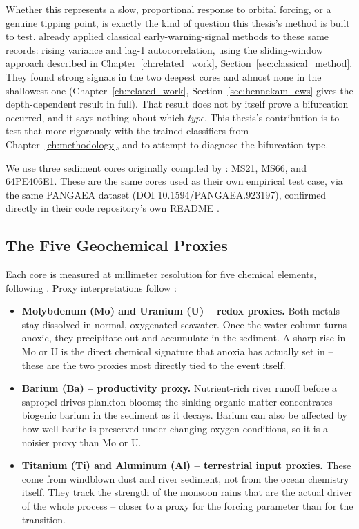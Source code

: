Whether this represents a slow, proportional response to orbital forcing, or a genuine tipping point, is exactly the kind of question this thesis's method is built to test. \citet{hennekam2020} already applied classical early-warning-signal methods to these same records: rising variance and lag-1 autocorrelation, using the sliding-window approach described in Chapter~\ref{ch:related_work}, Section~\ref{sec:classical_method}. They found strong signals in the two deepest cores and almost none in the shallowest one (Chapter~\ref{ch:related_work}, Section~\ref{sec:hennekam_ews} gives the depth-dependent result in full). That result does not by itself prove a bifurcation occurred, and it says nothing about which \emph{type}. This thesis's contribution is to test that more rigorously with the trained classifiers from Chapter~\ref{ch:methodology}, and to attempt to diagnose the bifurcation type.

We use three sediment cores originally compiled by \citet{hennekam2020}: MS21, MS66, and 64PE406E1. These are the same cores \citet{bury2021} used as their own empirical test case, via the same PANGAEA dataset (DOI 10.1594/PANGAEA.923197), confirmed directly in their code repository's own README \citep{burygithub}.

\subsection{The Five Geochemical Proxies}

Each core is measured at millimeter resolution for five chemical elements, following \citet{hennekam2020}. Proxy interpretations follow \citet{tribovillard2006}:

\begin{itemize}
    \item \textbf{Molybdenum (Mo) and Uranium (U) -- redox proxies.} Both metals stay dissolved in normal, oxygenated seawater. Once the water column turns anoxic, they precipitate out and accumulate in the sediment. A sharp rise in Mo or U is the direct chemical signature that anoxia has actually set in -- these are the two proxies most directly tied to the event itself.
    \item \textbf{Barium (Ba) -- productivity proxy.} Nutrient-rich river runoff before a sapropel drives plankton blooms; the sinking organic matter concentrates biogenic barium in the sediment as it decays. Barium can also be affected by how well barite is preserved under changing oxygen conditions, so it is a noisier proxy than Mo or U.
    \item \textbf{Titanium (Ti) and Aluminum (Al) -- terrestrial input proxies.} These come from windblown dust and river sediment, not from the ocean chemistry itself. They track the strength of the monsoon rains that are the actual driver of the whole process -- closer to a proxy for the forcing parameter than for the transition.
\end{itemize}

